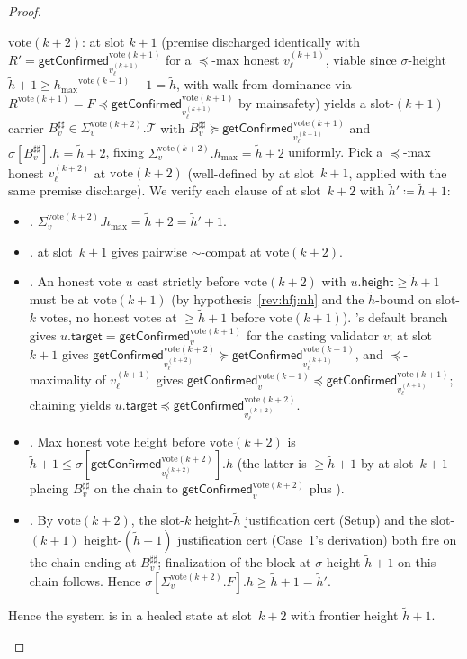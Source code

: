\documentclass{article}
\newcommand{\T}[0]{\ensuremath{\mathcal{T}}}
\newcommand{\target}{\mathsf{target}}
\newcommand{\height}{\mathsf{height}}
\newcommand{\hmax}{\ensuremath{h_{\max}}\xspace}
\newcommand{\vote}{\ensuremath{\mathrm{vote}}}
\newcommand{\comm}[1]{\ensuremath{\widetilde{#1}}}
\newcommand{\getConfirmed}{\textsf{getConfirmed}\xspace}
\theoremstyle{plain}
\theoremstyle{definition}
\theoremstyle{remark}
\begin{document}
\begin{proof}
\begin{description}
  $\vote(k+2)$:  at slot $k+1$ (premise discharged identically with $R' = \getConfirmed_{v_\ell^{(k+1)}}^{\vote(k+1)}$ for a $\preceq$-max honest $v_\ell^{(k+1)}$, viable since $\sigma$-height $\comm{h}+1 \geq \hmax^{\vote(k+1)}-1 = \comm{h}$, with walk-from dominance via $R^{\vote(k+1)} = F \preceq \getConfirmed_{v_\ell^{(k+1)}}^{\vote(k+1)}$ by mainsafety) yields a slot-$(k+1)$ carrier $B^{\sharp\sharp}_v \in \Sigma_v^{\vote(k+2)}.\T$ with $B^{\sharp\sharp}_v \succeq \getConfirmed_{v_\ell^{(k+1)}}^{\vote(k+1)}$ and $\sigma[B^{\sharp\sharp}_v].h = \comm{h}+2$, fixing $\Sigma_v^{\vote(k+2)}.\hmax = \comm{h}+2$ uniformly.
  Pick a $\preceq$-max honest $v_\ell^{(k+2)}$ at $\vote(k+2)$ (well-defined by  at slot~$k+1$, applied with the same premise discharge).
  We verify each clause of  at slot~$k+2$ with $\comm{h}' \coloneqq \comm{h}+1$:
  \begin{itemize}
    \item \emph{.} $\Sigma_v^{\vote(k+2)}.\hmax = \comm{h}+2 = \comm{h}'+1$.
    \item \emph{.}  at slot~$k+1$ gives pairwise $\sim$-compat at $\vote(k+2)$.
    \item \emph{.} An honest vote $u$ cast strictly before $\vote(k+2)$ with $u.\height \geq \comm{h}+1$ must be at $\vote(k+1)$ (by hypothesis~\ref{rev:hfj:nh} and the $\comm{h}$-bound on slot-$k$ votes, no honest votes at $\geq \comm{h}+1$ before $\vote(k+1)$). 's default branch gives $u.\target = \getConfirmed_v^{\vote(k+1)}$ for the casting validator $v$;  at slot~$k+1$ gives $\getConfirmed_{v_\ell^{(k+2)}}^{\vote(k+2)} \succeq \getConfirmed_{v_\ell^{(k+1)}}^{\vote(k+1)}$, and $\preceq$-maximality of $v_\ell^{(k+1)}$ gives $\getConfirmed_v^{\vote(k+1)} \preceq \getConfirmed_{v_\ell^{(k+1)}}^{\vote(k+1)}$; chaining yields $u.\target \preceq \getConfirmed_{v_\ell^{(k+2)}}^{\vote(k+2)}$.
    \item \emph{.} Max honest vote height before $\vote(k+2)$ is $\comm{h}+1 \leq \sigma[\getConfirmed_{v_\ell^{(k+2)}}^{\vote(k+2)}].h$ (the latter is $\geq \comm{h}+1$ by  at slot~$k+1$ placing $B^{\sharp\sharp}_v$ on the chain to $\getConfirmed_v^{\vote(k+2)}$ plus ).
    \item \emph{.} By $\vote(k+2)$, the slot-$k$ height-$\comm{h}$ justification cert (Setup) and the slot-$(k+1)$ height-$(\comm{h}+1)$ justification cert (Case~1's derivation) both fire on the chain ending at $B^{\sharp\sharp}_v$; finalization of the block at $\sigma$-height $\comm{h}+1$ on this chain follows. Hence $\sigma[\Sigma_v^{\vote(k+2)}.F].h \geq \comm{h}+1 = \comm{h}'$.
  \end{itemize}
  Hence the system is in a healed state at slot~$k+2$ with frontier height $\comm{h}+1$.


\end{description}
\end{proof}
\end{document}
